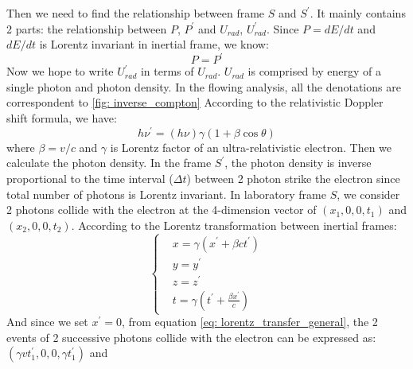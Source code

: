 \documentclass[12pt]{report}
\begin{document}
          Then we need to find the relationship between frame $S$ and $S^{\prime}$. It mainly contains 2 
          parts: the relationship between $P$, $P^{\prime}$ and $U_{rad}$, $U_{rad}^{\prime}$. Since 
          $P = dE/dt$ and $dE/dt$ is Lorentz invariant in inertial frame, we know: 
          \begin{equation}
            \label{eq: power_is_equal}
            P = P^{\prime}
          \end{equation}
          Now we hope to write $U_{rad}^{\prime}$ in terms of $U_{rad}$. $U_{rad}$ is comprised by 
          energy of a single photon and photon density. In the flowing analysis, all the denotations are 
          correspondent to \ref{fig: inverse_compton} According to the relativistic Doppler shift formula,
          we have: 
          \begin{equation}
            \label{eq: doppler_shift}
            h \nu^{\prime} = \left(h \nu\right) \gamma \left(1 + \beta \cos{\theta} \right)
          \end{equation}
          where $\beta = v / c$ and $\gamma$ is Lorentz factor of an ultra-relativistic electron. 
          Then we calculate the photon density. In the frame $S^{\prime}$, the photon density is
          inverse proportional to the time interval ($\Delta t$) between 2 photon strike the electron 
          since total number of photons is Lorentz invariant. In laboratory frame $S$, 
          we consider 2 photons collide with the electron at the 4-dimension vector of 
          $\left(x_{1}, 0, 0, t_{1}\right)$ and $\left(x_{2}, 0, 0, t_{2}\right)$. According to the 
          Lorentz transformation between inertial frames: 
          \begin{equation}
            \label{eq: lorentz_transfer_general}
              \begin{cases}
                 & x = \gamma \left( x^{\prime} + \beta c t^{\prime} \right)\\
                 & y = y^{\prime} \\
                 & z = z^{\prime} \\ 
                 & t = \gamma \left(t^{\prime} + \frac{\beta x^{\prime}}{c}\right)
              \end{cases}       
          \end{equation}
          And since we set $x^{\prime} = 0$, from equation \ref{eq: lorentz_transfer_general}, the 2 
          events of 2 successive photons collide with the electron can be expressed as:
          $\left(\gamma v t_{1}^{\prime}, 0, 0, \gamma t_{1}^{\prime}\right)$ and 
\end{document}
